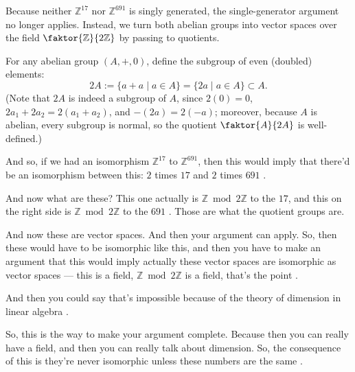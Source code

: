 \begin{content}


Because neither $\mathbb{Z}^{17}$ nor $\mathbb{Z}^{691}$ is singly generated, the single-generator argument no longer applies. Instead, we turn both abelian groups into vector spaces over the field $\faktor{\mathbb{Z}}{2\mathbb{Z}}$ by passing to quotients.

For any abelian group $(A, +, 0)$, define the subgroup of even (doubled) elements:
\[
2A := \{ a + a \mid a \in A \} = \{ 2a \mid a \in A \} \subset A.
\]
(Note that $2A$ is indeed a subgroup of $A$, since $2(0) = 0$, $2a_1 + 2a_2 = 2(a_1 + a_2)$, and $-(2a) = 2(-a)$; moreover, because $A$ is abelian, every subgroup is normal, so the quotient $\faktor{A}{2A}$ is well-defined.)
\end{content}

\begin{speech}[00:38:21 - 00:39:55]
And so, if we had an isomorphism $\mathbb{Z}^{17}$ to $\mathbb{Z}^{691}$, then this would imply that there'd be an isomorphism between this: $2$ times $17$ and $2$ times $691$ .

And now what are these? This one actually is $\mathbb{Z} \bmod 2\mathbb{Z}$ to the $17$, and this on the right side is $\mathbb{Z} \bmod 2\mathbb{Z}$ to the $691$ . Those are what the quotient groups are.

And now these are vector spaces. And then your argument can apply. So, then these would have to be isomorphic like this, and then you have to make an argument that this would imply actually these vector spaces are isomorphic as vector spaces --- this is a field, $\mathbb{Z} \bmod 2\mathbb{Z}$ is a field, that's the point .

And then you could say that's impossible because of the theory of dimension in linear algebra .

So, this is the way to make your argument complete. Because then you can really have a field, and then you can really talk about dimension. So, the consequence of this is they're never isomorphic unless these numbers are the same .
\end{speech}

